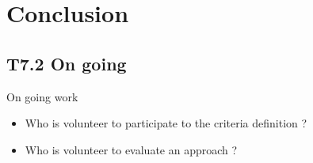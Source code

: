 
\section{Conclusion}

\subsection{T7.2 On going}

\begin{frame}{On going work}

  \begin{itemize}
  \item
    Who is volunteer to participate to the criteria definition ?
  \item
    Who is volunteer to evaluate an approach ?
  \end{itemize}
\end{frame}
